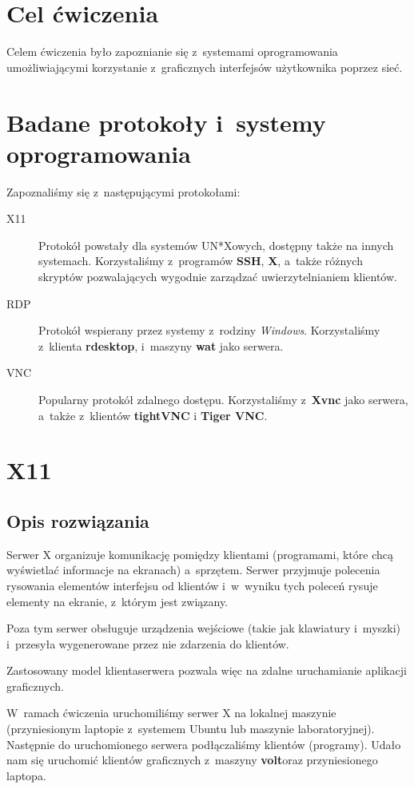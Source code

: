 \documentclass[a4paper]{article}
\newcommand{\ssh}{\textbf{SSH}}
\newcommand{\rdp}{\textbf{rdesktop}}
\newcommand{\xbin}{\textbf{X}}
\newcommand{\xvnc}{\textbf{Xvnc}}
\newcommand{\wat}{\textbf{wat}}
\newcommand{\volt}{\textbf{volt}}
\begin{document}
\section{Cel ćwiczenia}
Celem ćwiczenia było zapoznianie się z~systemami oprogramowania umożliwiającymi korzystanie z~graficznych interfejsów użytkownika poprzez sieć.
\section{Badane protokoły i~systemy oprogramowania}
Zapoznaliśmy się z~następującymi protokołami:
\begin{description}
  \item[X11] Protokół powstały dla systemów UN*X\dywiz owych, dostępny także na innych systemach. Korzystaliśmy z~programów \ssh, \xbin,
    a~także różnych skryptów pozwalających wygodnie zarządzać uwierzytelnianiem klientów.
  \item[RDP] Protokół wspierany przez systemy z~rodziny \emph{Windows}. Korzystaliśmy z~klienta \rdp, i~maszyny \wat{} jako serwera.
  \item[VNC] Popularny protokół zdalnego dostępu. Korzystaliśmy z~\xvnc{} jako serwera, a~także z~klientów \textbf{tightVNC} i \textbf{Tiger VNC}.
\end{description}

\section{X11}
\subsection{Opis rozwiązania}
Serwer X organizuje komunikację pomiędzy klientami (programami, które chcą wyświetlać informacje na ekranach) a~sprzętem.
Serwer przyjmuje polecenia rysowania elementów interfejsu od klientów i~w~wyniku tych poleceń rysuje elementy na ekranie, z~którym jest związany.

Poza tym serwer obsługuje urządzenia wejściowe (takie jak klawiatury i~myszki) i~przesyła wygenerowane przez nie zdarzenia do klientów.

Zastosowany model klienta\dywiz serwera pozwala więc na zdalne uruchamianie aplikacji graficznych.

W~ramach ćwiczenia uruchomiliśmy serwer X na lokalnej maszynie (przyniesionym laptopie z~systemem Ubuntu lub maszynie laboratoryjnej).
Następnie do uruchomionego serwera podłączaliśmy klientów (programy). Udało nam się uruchomić klientów graficznych z~maszyny \volt oraz przyniesionego laptopa.
\end{document}
